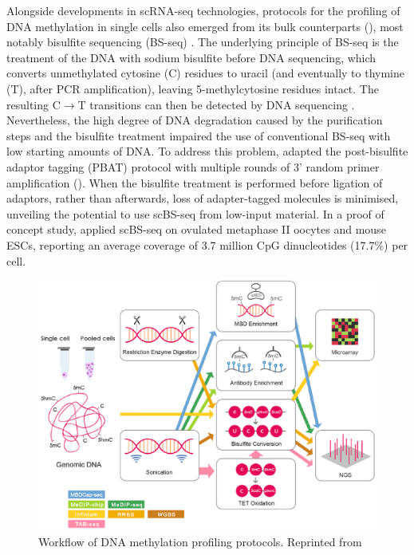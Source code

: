 Alongside developments in scRNA-seq technologies, protocols for the profiling of DNA methylation in single cells also emerged from its bulk counterparts (), most notably bisulfite sequencing (BS-seq) \cite{Smallwood2014,Guo2013,Gravina2016,Farlik2015}. The underlying principle of BS-seq is the treatment of the DNA with sodium bisulfite before DNA sequencing, which converts unmethylated cytosine (C) residues to uracil (and eventually to thymine (T), after PCR amplification), leaving 5-methylcytosine residues intact. The resulting C$\to$T transitions can then be detected by DNA sequencing \cite{Frommer1992,Clark2016,Clark2017}. Nevertheless, the high degree of DNA degradation caused by the purification steps and the bisulfite treatment impaired the use of conventional BS-seq with low starting amounts of DNA. To address this problem, \cite{Smallwood2014} adapted the post-bisulfite adaptor tagging (PBAT) protocol with multiple rounds of 3' random primer amplification (). When the bisulfite treatment is performed before ligation of adaptors, rather than afterwards, loss of adapter-tagged molecules is minimised, unveiling the potential to use scBS-seq from low-input material. In a proof of concept study, \cite{Smallwood2014} applied scBS-seq on ovulated metaphase II oocytes and mouse ESCs, reporting an average coverage of 3.7 million CpG dinucleotides (17.7\%) per cell.

\begin{figure}[H]
	\centering
	\includegraphics[width=0.8\linewidth]{methylation_protocols}
	\caption[]{Workflow of DNA methylation profiling protocols. Reprinted from \cite{Yong2016}}
	\label{fig:methylation_protocols}
\end{figure}


